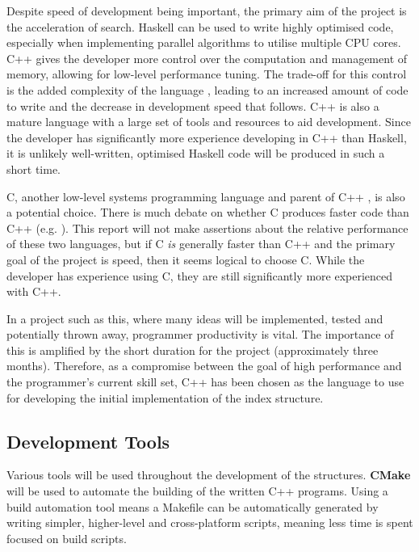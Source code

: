 Despite speed of development being important, the primary aim of the project is the acceleration of search. Haskell can be used to write highly optimised code, especially when implementing parallel algorithms to utilise multiple CPU cores. C++ gives the developer more control over the computation and management of memory, allowing for low-level performance tuning. The trade-off for this control is the added complexity of the language \cite{cpp-hard}, leading to an increased amount of code to write and the decrease in development speed that follows. C++ is also a mature language with a large set of tools and resources to aid development. Since the developer has significantly more experience developing in C++ than Haskell, it is unlikely well-written, optimised Haskell code will be produced in such a short time. 

C, another low-level systems programming language \cite{c-lang} and parent of C++ \cite{cpp}, is also a potential choice. There is much debate on whether C produces faster code than C++ (e.g. \cite{c-vs-cpp1, c-vs-cpp2, c-vs-cpp3}). This report will not make assertions about the relative performance of these two languages, but if C \textit{is} generally faster than C++ and the primary goal of the project is speed, then it seems logical to choose C. While the developer has experience using C, they are still significantly more experienced with C++.

In a project such as this, where many ideas will be implemented, tested and potentially thrown away, programmer productivity is vital. The importance of this is amplified by the short duration for the project (approximately three months). Therefore, as a compromise between the goal of high performance and the programmer's current skill set, C++ has been chosen as the language to use for developing the initial implementation of the index structure. 

\subsection{Development Tools}
\label{sec:development-tools}

Various tools will be used throughout the development of the structures. \textbf{CMake} \cite{cmake} will be used to automate the building of the written C++ programs. Using a build automation tool means a Makefile can be automatically generated by writing simpler, higher-level and cross-platform scripts, meaning less time is spent focused on build scripts.

